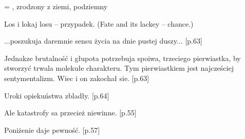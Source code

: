 

\pa
{} = , zrodzony z ziemi, podziemny

\pa
Los i lokaj losu -- przypadek. (Fate and its lackey -- chance.)

...poszukuja daremnie sensu \.{z}ycia na dnie pustej duszy... [p.63]

Jednakze brutalno\'{s}\'{c} i g{\l}upota potrzebuja spoiwa, trzeciego
pierwiastka, by stworzy\'{c} trwala moleku{\l}e charakteru. Tym pierwiastkiem
jest najcze\'{s}ciej sentymentalizm. Wiec i on zakocha{\l} sie. [p.63]

Uroki opieku\'{n}stwa zblad{\l}y. [p.64]

Ale  katastrofy sa przecie\.{z} niewinne. [p.55]

Poni\.{z}enie daje pewno\'{s}\'{c}. [p.57]


